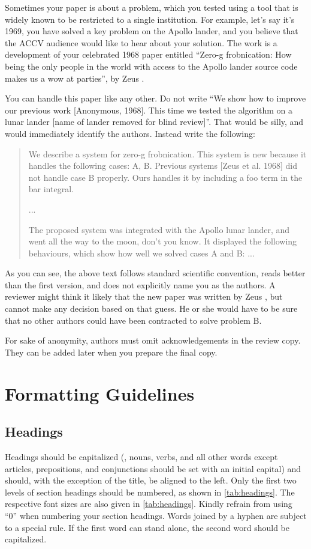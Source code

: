 \documentclass[runningheads]{llncs}
\begin{document}
Sometimes your paper is about a problem, which you tested using a tool that is widely known to be restricted to a single institution.
For example, let's say it's 1969, you have solved a key problem on the Apollo lander, and you believe that the ACCV audience would like to hear about your
solution.
The work is a development of your celebrated 1968 paper entitled ``Zero-g frobnication: How being the only people in the world with access to the Apollo lander source code makes us a wow at parties'', by Zeus \etal.

You can handle this paper like any other.
Do not write ``We show how to improve our previous work [Anonymous, 1968].
This time we tested the algorithm on a lunar lander [name of lander removed for blind review]''.
That would be silly, and would immediately identify the authors.
Instead write the following:
\begin{quotation}
   We describe a system for zero-g frobnication.
   This system is new because it handles the following cases:
   A, B.  Previous systems [Zeus et al. 1968] did not  handle case B properly.
   Ours handles it by including a foo term in the bar integral.

   ...

   The proposed system was integrated with the Apollo lunar lander, and went all the way to the moon, don't you know.
   It displayed the following behaviours, which show how well we solved cases A and B: ...
\end{quotation}
As you can see, the above text follows standard scientific convention, reads better than the first version, and does not explicitly name you as the authors.
A reviewer might think it likely that the new paper was written by Zeus \etal, but cannot make any decision based on that guess.
He or she would have to be sure that no other authors could have been contracted to solve problem B.

For sake of anonymity, authors must omit acknowledgements in the review copy. 
They can be added later when you prepare the final copy.


\section{Formatting Guidelines}

\subsection{Headings}
Headings should be capitalized (\ie, nouns, verbs, and all other words except articles, prepositions, and conjunctions should be set with an initial capital) and should, with the exception of the title, be aligned to the left.
Only the first two levels of section headings should be numbered, as shown in \cref{tab:headings}.
The respective font sizes are also given in \cref{tab:headings}. 
Kindly refrain from using ``0'' when numbering your section headings.
Words joined by a hyphen are subject to a special rule. 
If the first word can stand alone, the second word should be capitalized.
\end{document}
